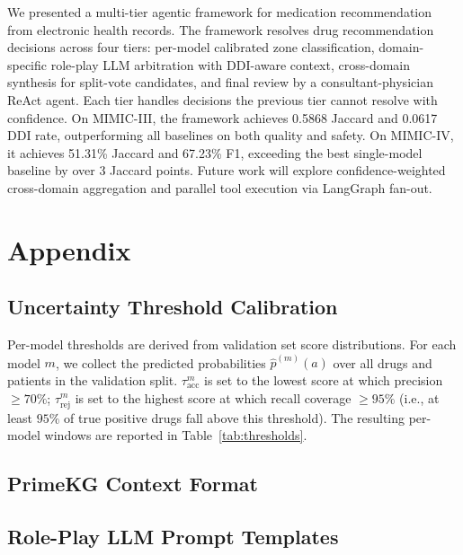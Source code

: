 \documentclass[sigconf,anonymous]{acmart}
\begin{document}
We presented a multi-tier agentic framework for medication recommendation from electronic health records. The framework resolves drug recommendation decisions across four tiers: per-model calibrated zone classification, domain-specific role-play LLM arbitration with DDI-aware context, cross-domain synthesis for split-vote candidates, and final review by a consultant-physician ReAct agent. Each tier handles decisions the previous tier cannot resolve with confidence. On MIMIC-III, the framework achieves 0.5868 Jaccard and 0.0617 DDI rate, outperforming all baselines on both quality and safety. On MIMIC-IV, it achieves 51.31\% Jaccard and 67.23\% F1, exceeding the best single-model baseline by over 3 Jaccard points. Future work will explore confidence-weighted cross-domain aggregation and parallel tool execution via LangGraph fan-out.

\begin{acks}
\end{acks}





\appendix

\section{Appendix}

\subsection{Uncertainty Threshold Calibration}
Per-model thresholds are derived from validation set score distributions. For each model $m$, we collect the predicted probabilities $\hat{p}^{(m)}(a)$ over all drugs and patients in the validation split. $\tau_{\text{acc}}^m$ is set to the lowest score at which precision $\geq 70\%$; $\tau_{\text{rej}}^m$ is set to the highest score at which recall coverage $\geq 95\%$ (i.e., at least $95\%$ of true positive drugs fall above this threshold). The resulting per-model windows are reported in Table~\ref{tab:thresholds}. 

\subsection{PrimeKG Context Format}

\subsection{Role-Play LLM Prompt Templates}
\end{document}
